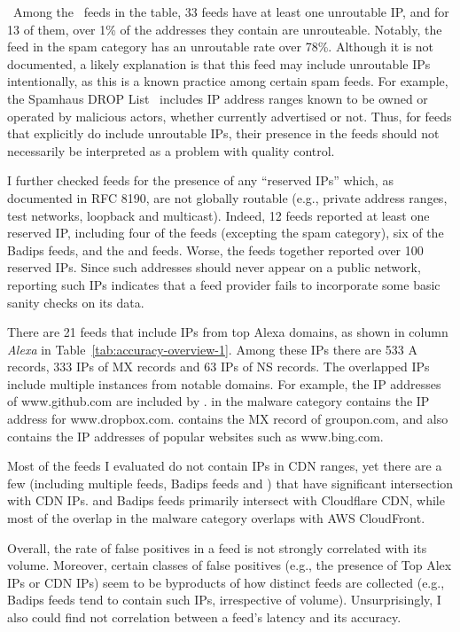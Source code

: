 \finding\ Among the \numipfeeds\ feeds in the table, 33 feeds have at
least one unroutable IP, and for 13 of them, over 1\% of the addresses
they contain are unrouteable. Notably, the {\feedetiprep} feed in the
spam category has an unroutable rate over 78\%.  Although it is not
documented, a likely explanation is that this feed may include unroutable
IPs intentionally, as this is a known practice among certain spam
feeds. For example, the Spamhaus DROP List~\cite{Spamhaus} includes IP
address ranges known to be owned or operated by malicious actors,
whether currently advertised or not. Thus, for feeds that explicitly
do include unroutable IPs, their presence in the feeds should not
necessarily be interpreted as a problem with quality control.

I further checked feeds for the presence of any ``reserved IPs''
which, as documented in RFC 8190, are not globally routable (e.g., private
address ranges, test networks, loopback and multicast).  Indeed,
12 feeds reported at least one reserved IP, including four of the
{\feedetiprep} feeds (excepting the spam category), six of the Badips
feeds, and the {\feedFBAdmin} and {\feeddshield} feeds. Worse, the
{\feedetiprep} feeds together reported over 100 reserved IPs. Since
such addresses should never appear on a public network,
reporting such IPs indicates that a feed provider fails to
incorporate some basic sanity checks on its data.

There are 21 feeds that include IPs from top Alexa domains, as shown
in column \textit{Alexa} in Table~\ref{tab:accuracy-overview-1}. Among
these IPs there are 533 A records, 333 IPs of MX records and 63 IPs of
NS records.  The overlapped IPs include multiple instances from
notable domains. For example, the IP addresses of www.github.com are
included by {\feedmalcode}.  {\feedetiprep} in the malware category
contains the IP address for www.dropbox.com.  {\feedalienvault}
contains the MX record of groupon.com, and {\feedbadipssh} also
contains the IP addresses of popular websites such as www.bing.com.

Most of the feeds I evaluated do not contain IPs in CDN ranges, yet
there are a few (including multiple {\feedetiprep} feeds, Badips feeds
and {\feedalienvault}) that have significant intersection with CDN
IPs. {\feedalienvault} and Badips feeds primarily intersect with
Cloudflare CDN, while most of the overlap in the {\feedetiprep} malware
category overlaps with AWS CloudFront.

Overall, the rate of false positives in a feed is not strongly
correlated with its volume.  Moreover, certain classes of false
positives (e.g., the presence of Top Alex IPs or CDN IPs) seem to
be byproducts of how distinct feeds are collected (e.g., Badips
feeds tend to contain such IPs, irrespective of volume).
Unsurprisingly, I also could find not correlation between a feed's
latency and its accuracy.